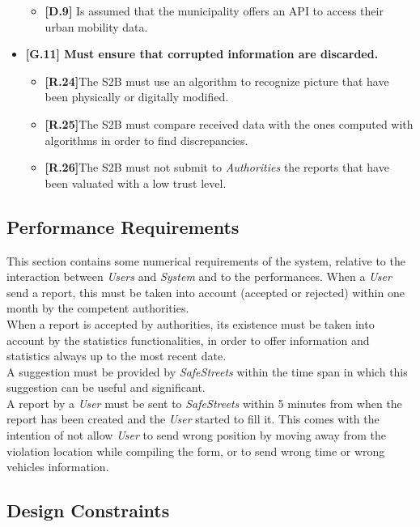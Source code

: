 \begin{itemize}
\begin{itemize}
          \item \textbf{[D.9]} Is assumed that the municipality offers an API to access their urban mobility data.
          
    \end{itemize}
    
\item \textbf{{[G.11]} Must ensure that corrupted information are discarded.}
    \begin{itemize}
        \item \textbf{[R.24]}The S2B must use an algorithm to recognize picture that have been physically or digitally modified.
        
        \item \textbf{[R.25]}The S2B must compare received data with the ones computed with algorithms in order to find discrepancies.
        
        \item \textbf{[R.26]}The S2B must not submit to \textit{Authorities} the reports that have been valuated with a low trust level.
    \end{itemize}
\end{itemize}


\subsection{Performance Requirements}
This section contains some numerical requirements of the system, relative to the interaction between \textit{Users} and \textit{System} and to the performances.
When a \textit{User} send a report, this must be taken into account (accepted or rejected) within one month by the competent authorities.\\
When a report is accepted by authorities, its existence must be taken into account by the statistics functionalities, in order to offer information and statistics always up to the most recent date.\\
A suggestion must be provided by \textit{SafeStreets} within the time span in which this suggestion can be useful and significant. \\
A report by a \textit{User} must be sent to \textit{SafeStreets} within 5 minutes from when the report has been created and the \textit{User} started to fill it. This comes with the intention of not allow \textit{User} to send wrong position by moving away from the violation location while compiling the form, or to send wrong time or wrong vehicles information.
\subsection{Design
Constraints}

